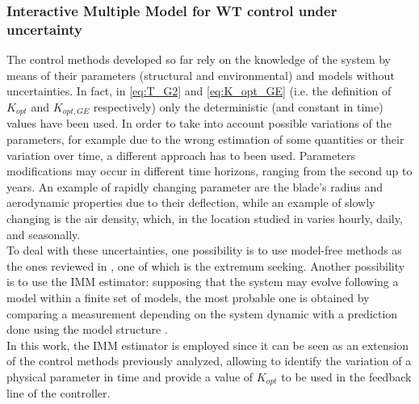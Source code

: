                     

\subsubsection{Interactive Multiple Model for WT control under uncertainty}\label{sec:c_other_controls}
The control methods developed so far rely on the knowledge of the system by means of their parameters (structural and environmental) and models without uncertainties. In fact, in \autoref{eq:T_G2} and \autoref{eq:K_opt_GE} (i.e. the definition of $K_{opt}$ and $K_{opt,GE}$ respectively) only the deterministic (and constant in time) values have been used. In order to take into account possible variations of the parameters, for example due to the wrong estimation of some quantities or their variation over time, a different approach has to been used. Parameters modifications may occur in different time horizons, ranging from the second up to years. An example of rapidly changing parameter are the blade's radius and aerodynamic properties due to their deflection, while an example of slowly changing is the air density, which, in the location studied in \cite{air_density} varies hourly, daily, and seasonally. \\
To deal with these uncertainties, one possibility is to use model-free methods as the ones reviewed in \cite{MOUSA2021106598}, one of which is the extremum seeking. Another possibility is to use the \acrfull{IMM} estimator: supposing that the system may evolve following a model within a finite set of models, the most probable one is obtained by comparing a measurement depending on the system dynamic with a prediction done using the model structure \cite{Bar_Shalom}. \\
In this work, the IMM estimator is employed since it can be seen as an extension of the control methods previously analyzed, allowing to identify the variation of a physical parameter in time and provide a value of $K_{opt}$ to be used in the feedback line of the controller.

